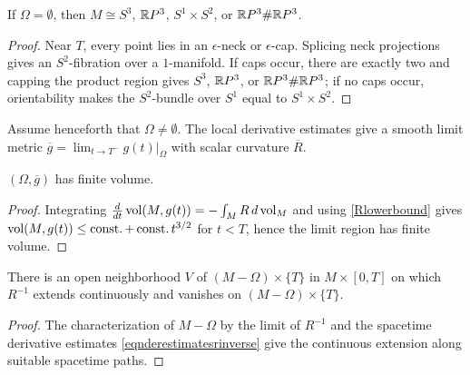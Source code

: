\begin{lemma}
  \label{lem:kl-structure-at-first-singularity-time-rigidity-structure-at-first-singularity-time}
 \label{standard}
If $\Omega=\emptyset$, then
$M\cong S^3$, ${\mathbb R} P^3$, $S^1\times S^2$, or
${\mathbb R} P^3\#{\mathbb R} P^3$.
\end{lemma}
\begin{proof}
\sketch Near $T$, every point lies in an $\epsilon$-neck or $\epsilon$-cap.
Splicing neck projections gives an $S^2$-fibration over a $1$-manifold. If
caps occur, there are exactly two and capping the product region gives
$S^3$, ${\mathbb R} P^3$, or ${\mathbb R} P^3\#{\mathbb R} P^3$; if no caps occur, orientability makes the
$S^2$-bundle over $S^1$ equal to $S^1\times S^2$.
\end{proof}

Assume henceforth that $\Omega\ne\emptyset$. The local derivative estimates
give a smooth limit metric $\overline g=\lim_{t\to T^-}g(t)|_\Omega$ with scalar
curvature $\overline R$.

\begin{lemma}
  \label{lem:kl-structure-at-first-singularity-time-volume-lemma}
 \label{volumeomega}
$(\Omega,\overline g)$ has finite volume.
\end{lemma}
\begin{proof}
\sketch Integrating
$\frac{d}{dt}\operatorname{vol}(M,g(t))=-\int_MR\,d\operatorname{vol}_M$ and using
\eqref{Rlowerbound} gives $\operatorname{vol}(M,g(t))\leq\operatorname{const.}+\operatorname{const.} t^{3/2}$ for
$t<T$, hence the limit region has finite volume.
\end{proof}

\begin{lemma}
  \label{lem:kl-structure-at-first-singularity-time-existence-structure-at-first-singularity-time}

\label{lemrinverseextends}
There is an open neighborhood $V$ of $(M-\Omega)\times\{T\}$ in
$M\times[0,T]$ on which $R^{-1}$ extends continuously and vanishes on
$(M-\Omega)\times\{T\}$.
\end{lemma}
\begin{proof}
\sketch The characterization of $M-\Omega$ by the limit of $R^{-1}$ and the
spacetime derivative estimates \eqref{eqnderestimatesrinverse} give the
continuous extension along suitable spacetime paths.
\end{proof}

